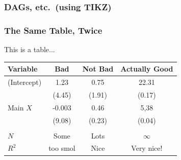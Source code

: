 \documentclass[10pt]{beamer}
\newcommand{\+}{\item}
\newcommand{\?}{\item[$\cdot$]}
\newcommand{\0}{\mathbf{0}}
\newcommand{\1}{\mathbf{1}}
\begin{document}
\begin{frame}[fragile] \frametitle{DAGs, etc.\ (using TIKZ)}


\begin{center}
\end{center}

\end{frame}


\begin{frame}[fragile,shrink=10] \frametitle{The Same Table, Twice}



\begin{center}
This is a table... \\
\smallskip
\begin{tabular}{lccc}
\hline \hline
Variable & Bad & Not Bad & Actually Good \\
\hline
(Intercept) &   1.23   &   0.75    &   22.31   \\
                  & (4.45)  & (1.91)    &  (0.17) \\
Main $X$   &  -0.003 &  0.46    &  5,38    \\
                  & (9.08)  & (0.23)    &  (0.04) \\
                 &            &              &                \\
$N$          & Some  &  Lots     &   $\infty$  \\
$R^{2}$    & too smol & Nice & Very nice! \\
\hline \hline
\end{tabular}
\end{center}

\bigskip



\end{frame}
\end{document}
